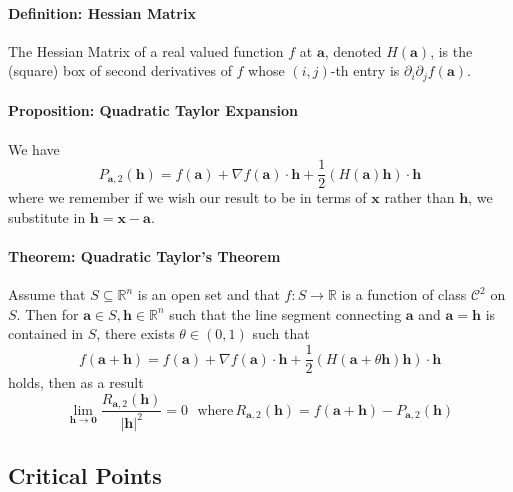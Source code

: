 \documentclass[11pt]{article}
\newcommand{\real}{\mathbb{R}}
\newcommand{\va}{\mathbf{a}}
\newcommand{\vx}{\mathbf{x}}
\newcommand{\vh}{\mathbf{h}}
\newcommand{\vzero}{\mathbf{0}}
\begin{document}
\paragraph{Definition: Hessian Matrix} The Hessian Matrix of a real valued function $f$ at $\va$, denoted $H(\va)$, is the (square) box of second derivatives of $f$ whose $(i,j)$-th entry is $\partial_i\partial_j f(\va)$.

\paragraph{Proposition: Quadratic Taylor Expansion} We have
\begin{equation*}
    P_{\va,2}(\vh) = f(\va) + \nabla f(\va)\cdot \vh + \frac{1}{2}(H(\va)\vh)\cdot \vh
\end{equation*}
where we remember if we wish our result to be in terms of $\vx$ rather than $\vh$, we substitute in $\vh = \vx - \va$.

\paragraph{Theorem: Quadratic Taylor's Theorem} Assume that $S\subseteq \real^n$ is an open set and that $f:S\to \real$ is a function of class $\mathcal{C}^2$ on $S$. Then for $\va\in S, \vh \in \real^n$ such that the line segment connecting $\va$ and $\va = \vh$ is contained in $S$, there exists $\theta\in (0,1)$ such that
\begin{equation*}
    f(\va + \vh) = f(\va)+\nabla f(\va)\cdot \vh + \frac{1}{2}(H(\va + \theta \vh)\vh)\cdot \vh
\end{equation*}
holds, then as a result
\begin{equation*}
    \lim_{\vh\to \vzero}\frac{R_{\va,2}(\vh)}{|\vh|^2} = 0\,\,\,\,\text{where}\,R_{\va,2}(\vh) = f(\va+\vh) - P_{\va,2}(\vh)
\end{equation*}

\subsection{Critical Points}
\end{document}
